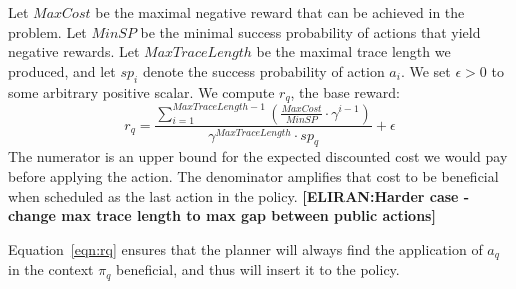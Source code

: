 \documentclass[letterpaper]{article} %
\newcommand{\eliran}[1]{\textbf{[\color{red}ELIRAN:#1]}}
\begin{document}
Let $MaxCost$ be the maximal negative reward that can be achieved in the problem. Let $MinSP$ be the minimal success probability of actions that yield negative rewards. Let $MaxTraceLength$ be the maximal trace length we produced, and let $sp_i$ denote the success probability of action $a_i$. We set $\epsilon > 0$ to some arbitrary positive scalar. We compute $r_q$, the base reward:
\begin{equation}
\label{eqn:rq}
   r_q = \frac{\sum_{i=1}^{MaxTraceLength-1}(\frac{MaxCost}{MinSP} \cdot \gamma^{i-1})}{\gamma^{MaxTraceLength}\cdot sp_q} + \epsilon
\end{equation}%
The numerator is an upper bound for the expected discounted cost we would pay before applying the action. The denominator amplifies that cost to be beneficial when scheduled as the last action in the policy.
\eliran{Harder case - change max trace length to max gap between public actions} 

Equation~\ref{eqn:rq} ensures that the planner will always find the application of $a_q$ in the context $\pi_q$ beneficial, and thus will insert it to the policy.
\end{document}
